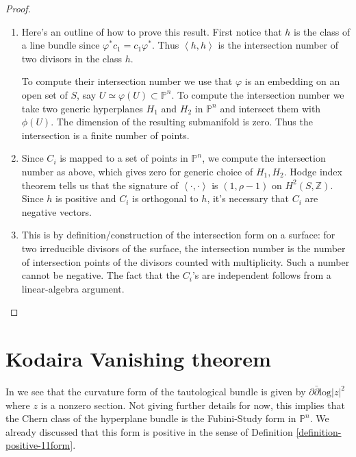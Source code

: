 \documentclass{book}
\begin{document}
\begin{proof}
\begin{enumerate}
\item Here's an outline of how to prove this
result.
First notice that $h$ is the class of a line
bundle
since $\varphi^*c_1=c_1\varphi^*$.
Thus $\left\langle{}h,h\right\rangle{}$ is the intersection
number
of two divisors in the class $h$.

To compute their intersection number
we use that $\varphi$ is an embedding on an
open set of $S$,
say $U \simeq \varphi(U) \subset
\mathbb{P}^n$.
To compute the intersection number we take
two generic hyperplanes $H_1$ and $H_2$
in $\mathbb{P}^n$ and intersect them with
$\phi(U)$.
The dimension of the resulting submanifold is
zero.
Thus the intersection is a finite number of
points.

\item Since $C_i$ is mapped to a set of
points in $\mathbb{P}^n$,
we compute the intersection number as above,
which gives zero
for generic choice of $H_1,H_2$. Hodge index
theorem tells us that
the signature of $\left\langle{}\cdot,\cdot\right\rangle{}$
is $(1,\rho-1)$ on
$H^2(S,\mathbb{Z})$. Since $h$ is positive
and $C_i$ is orthogonal to $h$,
it's necessary that $C_i$ are negative
vectors.

\item This is by definition/construction of
the intersection form on a surface:
for two irreducible divisors of the surface,
the intersection number is the number of
intersection points
of the divisors counted with multiplicity.
Such a number cannot be negative.
The fact that the $C_i$'s are independent
follows from a linear-algebra
argument.
\end{enumerate}
\end{proof}

\section{Kodaira Vanishing theorem}
\label{section-kodaira-vanishing}

\noindent
In \cite[p. 150]{gri}
we see that the curvature form of the
tautological bundle
is given by $\partial\bar\partial \text{log}
|z|^2$
where $z$ is a nonzero section.
Not giving further details for now,
this implies that the Chern class of the
hyperplane bundle
is the Fubini-Study form in $\mathbb{P}^n$.
We already discussed that this form is
positive
in the sense of Definition
\ref{definition-positive-11form}.
\end{document}
